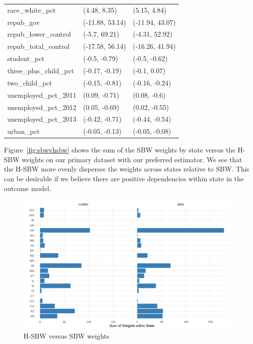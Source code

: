 \begin{table}[ht]
\begin{tabular}{lll}
  race\_white\_pct & (4.48, 8.35) & (5.15, 4.84) \\ 
  repub\_gov & (-11.88, 53.14) & (-11.94, 43.07) \\ 
  repub\_lower\_control & (-5.7, 69.21) & (-4.31, 52.92) \\ 
  repub\_total\_control & (-17.58, 56.14) & (-16.26, 41.94) \\ 
  student\_pct & (-0.5, -0.79) & (-0.5, -0.62) \\ 
  three\_plus\_child\_pct & (-0.17, -0.19) & (-0.1, 0.07) \\ 
  two\_child\_pct & (-0.15, -0.81) & (-0.16, -0.24) \\ 
  unemployed\_pct\_2011 & (0.09, -0.71) & (0.08, -0.6) \\ 
  unemployed\_pct\_2012 & (0.05, -0.69) & (0.02, -0.55) \\ 
  unemployed\_pct\_2013 & (-0.42, -0.71) & (-0.44, -0.54) \\ 
  urban\_pct & (-0.05, -0.13) & (-0.05, -0.08) \\ 
   \bottomrule
\end{tabular}
\end{table}

Figure~\ref{fig:sbwvhsbw} shows the sum of the SBW weights by state versus the H-SBW weights on our primary dataset with our preferred estimator. We see that the H-SBW more evenly disperses the weights across states relative to SBW. This can be desirable if we believe there are positive dependencies within state in the outcome model.

\begin{figure}[]
\begin{center}
    \caption{H-SBW versus SBW weights}
    \label{fig:corrmatrix}
    \includegraphics[scale=0.6]{01_Plots/weights-by-state-sbw-hsbw-c1.png}
\end{center}
\end{figure}

